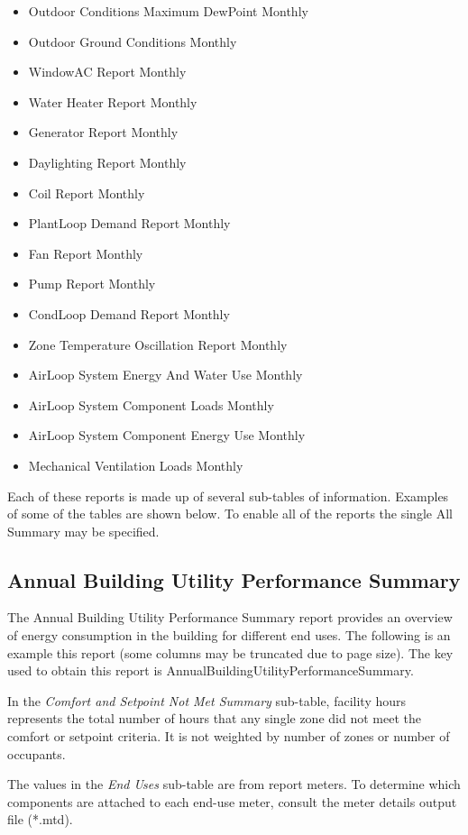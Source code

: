 \begin{itemize}
  Outdoor Conditions Maximum WetBulb Monthly
\item
  Outdoor Conditions Maximum DewPoint Monthly
\item
  Outdoor Ground Conditions Monthly
\item
  WindowAC Report Monthly
\item
  Water Heater Report Monthly
\item
  Generator Report Monthly
\item
  Daylighting Report Monthly
\item
  Coil Report Monthly
\item
  PlantLoop Demand Report Monthly
\item
  Fan Report Monthly
\item
  Pump Report Monthly
\item
  CondLoop Demand Report Monthly
\item
  Zone Temperature Oscillation Report Monthly
\item
  AirLoop System Energy And Water Use Monthly
\item
  AirLoop System Component Loads Monthly
\item
  AirLoop System Component Energy Use Monthly
\item
  Mechanical Ventilation Loads Monthly
\end{itemize}

Each of these reports is made up of several sub-tables of information. Examples of some of the tables are shown below. To enable all of the reports the single All Summary may be specified.

\subsection{Annual Building Utility Performance Summary}\label{annual-building-utility-performance-summary}

The Annual Building Utility Performance Summary report provides an overview of energy consumption in the building for different end uses. The following is an example this report (some columns may be truncated due to page size). The key used to obtain this report is AnnualBuildingUtilityPerformanceSummary.

In the \emph{Comfort and Setpoint Not Met Summary} sub-table, facility hours represents the total number of hours that any single zone did not meet the comfort or setpoint criteria. It is not weighted by number of zones or number of occupants.

The values in the \emph{End Uses} sub-table are from report meters. To determine which components are attached to each end-use meter, consult the meter details output file (*.mtd).

